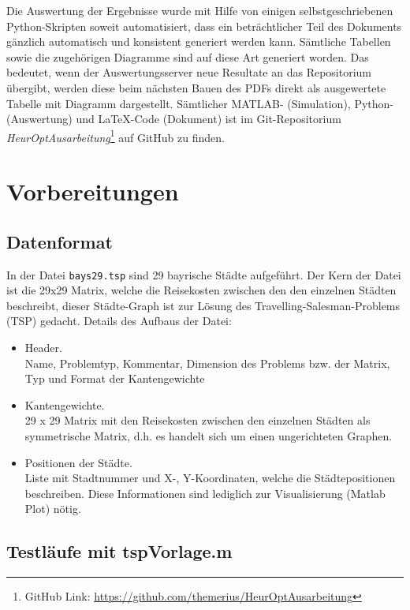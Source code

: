Die Auswertung der Ergebnisse wurde mit Hilfe von einigen selbstgeschriebenen
Python-Skripten soweit automatisiert, dass ein beträchtlicher Teil des
Dokuments gänzlich automatisch und konsistent generiert werden kann.
Sämtliche Tabellen sowie die zugehörigen Diagramme sind auf diese Art
generiert worden.
Das bedeutet, wenn der Auswertungsserver neue Resultate an das
Repositorium übergibt, werden diese beim nächsten Bauen des PDFs
direkt als ausgewertete Tabelle mit Diagramm dargestellt.
Sämtlicher MATLAB- (Simulation), Python- (Auswertung) und LaTeX-Code (Dokument)
ist im Git-Repositorium \emph{HeurOptAusarbeitung}\footnote{
GitHub Link: \url{https://github.com/themerius/HeurOptAusarbeitung}} auf GitHub
zu finden. 


\section{Vorbereitungen}


\subsection{Datenformat}

\noindent In der Datei {\tt bays29.tsp} sind 29 bayrische Städte aufgeführt.
Der Kern der Datei ist die 29x29 Matrix, welche die Reisekosten zwischen
den den einzelnen Städten beschreibt, dieser Städte-Graph ist zur Lösung
des Travelling-Salesman-Problems (TSP) gedacht.
Details des Aufbaus der Datei:

\begin{itemize}
  \item Header.\\
  Name, Problemtyp, Kommentar, Dimension des Problems bzw. der Matrix, Typ und Format der Kantengewichte
  \item Kantengewichte.\\
  29 x 29 Matrix mit den Reisekosten zwischen den einzelnen Städten als symmetrische Matrix, d.h. es handelt sich um einen ungerichteten Graphen.
  \item Positionen der Städte.\\
  Liste mit Stadtnummer und X-, Y-Koordinaten, welche die Städtepositionen beschreiben.
  Diese Informationen sind lediglich zur Visualisierung (Matlab Plot) nötig.
\end{itemize}


\subsection{Testläufe mit tspVorlage.m}

